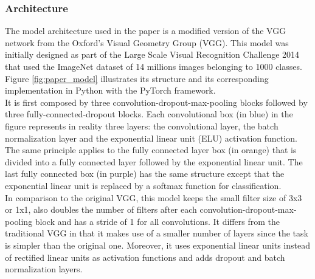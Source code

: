 \subsubsection{Architecture}
The model architecture used in the paper is a modified version of the VGG network from the Oxford's Visual Geometry Group (VGG). This model was initially designed as part of the Large Scale Visual Recognition Challenge 2014 that used the ImageNet dataset of 14 millions images belonging to 1000 classes. Figure \ref{fig:paper_model} illustrates its structure and its corresponding implementation in Python with the PyTorch framework.\\
It is first composed by three convolution-dropout-max-pooling blocks followed by three fully-connected-dropout blocks. Each convolutional box (in blue) in the figure represents in reality three layers: the convolutional layer, the batch normalization layer and the exponential linear unit (ELU) activation function. The same principle applies to the fully connected layer box (in orange) that is divided into a fully connected layer followed by the exponential linear unit. The last fully connected box (in purple) has the same structure except that the exponential linear unit is replaced by a softmax  function for classification.\\
In comparison to the original VGG, this model keeps the small filter size of 3x3 or 1x1, also doubles the number of filters after each convolution-dropout-max-pooling block and has a stride of 1 for all convolutions. It differs from the traditional VGG in that it makes use of a smaller number of layers since the task is simpler than the original one. Moreover, it uses exponential linear units instead of rectified linear units as activation functions and adds dropout and batch normalization layers.
